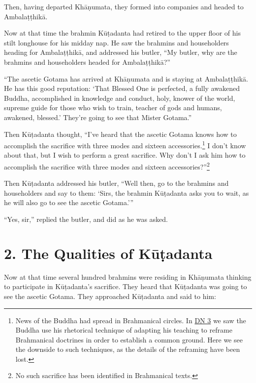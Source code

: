 \documentclass[12pt,openany]{book}%
\begin{document}
Then, having departed \textsanskrit{Khāṇumata}, they formed into companies and headed to \textsanskrit{Ambalaṭṭhikā}. 

Now at that time the brahmin \textsanskrit{Kūṭadanta} had retired to the upper floor of his stilt longhouse for his midday nap. He saw the brahmins and householders heading for \textsanskrit{Ambalaṭṭhikā}, and addressed his butler, “My butler, why are the brahmins and householders headed for \textsanskrit{Ambalaṭṭhikā}?” 

“The ascetic Gotama has arrived at \textsanskrit{Khāṇumata} and is staying at \textsanskrit{Ambalaṭṭhikā}. He has this good reputation: ‘That Blessed One is perfected, a fully awakened Buddha, accomplished in knowledge and conduct, holy, knower of the world, supreme guide for those who wish to train, teacher of gods and humans, awakened, blessed.’ They’re going to see that Mister Gotama.” 

Then \textsanskrit{Kūṭadanta} thought, “I’ve heard that the ascetic Gotama knows how to accomplish the sacrifice with three modes and sixteen accessories.\footnote{News of the Buddha had spread in Brahmanical circles. In \href{https://suttacentral.net/dn3/en/sujato}{DN 3} we saw the Buddha use his rhetorical technique of adapting his teaching to reframe Brahmanical doctrines in order to establish a common ground. Here we see the downside to such techniques, as the details of the reframing have been lost. } I don’t know about that, but I wish to perform a great sacrifice. Why don’t I ask him how to accomplish the sacrifice with three modes and sixteen accessories?”\footnote{No such sacrifice has been identified in Brahmanical texts. } 

Then \textsanskrit{Kūṭadanta} addressed his butler, “Well then, go to the brahmins and householders and say to them: ‘Sirs, the brahmin \textsanskrit{Kūṭadanta} asks you to wait, as he will also go to see the ascetic Gotama.’” 

“Yes, sir,” replied the butler, and did as he was asked. 

\section*{2. The Qualities of \textsanskrit{Kūṭadanta} }

Now at that time several hundred brahmins were residing in \textsanskrit{Khāṇumata} thinking to participate in \textsanskrit{Kūṭadanta}’s sacrifice. They heard that \textsanskrit{Kūṭadanta} was going to see the ascetic Gotama. They approached \textsanskrit{Kūṭadanta} and said to him: 
\end{document}
